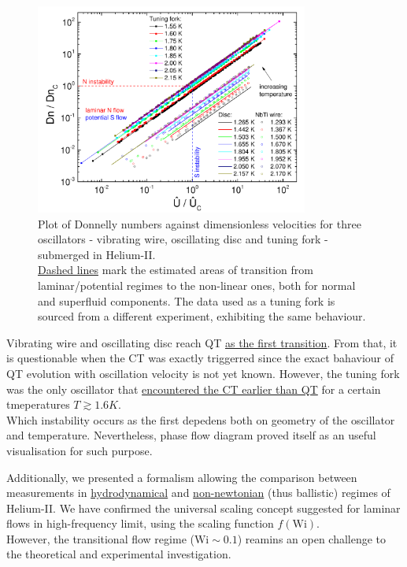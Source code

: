 \begin{figure}[h]
	\centering
	\includegraphics[width=0.8\textwidth]{graphics/results/flow_phase_diagram}
	\caption{Plot of Donnelly numbers against dimensionless velocities for three oscillators - vibrating wire, oscillating disc and tuning fork - submerged in Helium-II.\\
	\underline{Dashed lines} mark the estimated areas of transition from laminar/potential regimes to the non-linear ones, both for normal and superfluid components. The data used as a tuning fork is sourced from a different experiment, exhibiting the same behaviour.}
	\label{flow_phase_diagram}
\end{figure}

Vibrating wire and oscillating disc reach QT \underline{as the first transition}. From that, it is questionable when the CT was exactly triggerred since the exact bahaviour of QT evolution with oscillation velocity is not yet known. However, the tuning fork was the only oscillator that \underline{encountered the CT earlier than QT} for a certain tmeperatures $T \gtrsim 1.6\unit{K}$.\\
Which instability occurs as the first depedens both on geometry of the oscillator and temperature. Nevertheless, phase flow diagram proved itself as an useful visualisation for such purpose.

Additionally, we presented a formalism allowing the comparison between measurements in \underline{hydrodynamical} and \underline{non-newtonian} (thus ballistic) regimes of Helium-II. We have confirmed the universal scaling concept suggested for laminar flows in high-frequency limit, using the scaling function $f(\text{Wi})$.\\
However, the transitional flow regime ($\text{Wi} \sim 0.1$) reamins an open challenge to the theoretical and experimental investigation.


